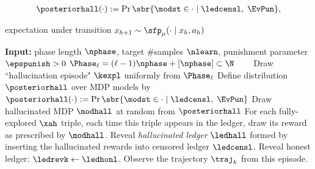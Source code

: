 \begin{align*}
 \posteriorhall(\cdot) := \Pr\sbr{\modst \in \cdot \mid \ledcensl,\; \EvPun},
 \end{align*}

expectation under transition $x_{h+1} \sim \sfp_{\model}(\cdot \mid x_h,a_h)$


\begin{algorithm}[h]
    \begin{algorithmic}[1]
    \State{}\textbf{Input: }
        phase length $\nphase$, target {\#samples} $\nlearn$, punishment parameter $\epspunish>0$
    \State{}$\Phase_{\ell} = (\ell-1) \nphase  + [\nphase] \subset \N$
        ~~~
    \State{}Draw ``hallucination episode" $\kexpl$ uniformly from $\Phase_{\ell}$
    \State{}
    \State{}Define distribution $\posteriorhall$ over MDP models by\\ \qquad\qquad\qquad$\posteriorhall(\cdot) := \Pr\sbr{\modst \in \cdot \mid \ledcensl,\; \EvPun}$
    \State{}Draw hallucinated MDP $\modhall$ at random from $\posteriorhall$
     \State{}For each fully-explored $\xah$ triple,
     \State{}\hspace{2em}each time this triple appears in the ledger,
     \State{}\hspace{2em}draw its reward as prescribed by $\modhall$.
     \State{}Reveal \emph{hallucinated ledger } $\ledhall$ formed by  \\
     \qquad\qquad \qquad inserting the hallucinated rewards into censored ledger $\ledcensl$.
    \Else{} 
     \State{}Reveal honest ledger: $\ledrevk \gets \ledhonl$.
    \EndIf
    \State{}Observe the trajectory $\traj_k$ from this episode.
  \EndFor
  \EndFor
  \end{algorithmic}
  \caption{\mdphh}
  \label{alg:MDP_HH}
    \end{algorithm}